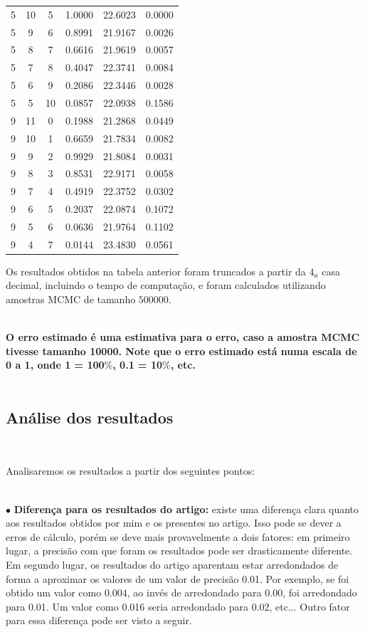 \documentclass[pt12]{article}
\begin{document}
\begin{center}
\begin{tabular}{|ccc|c|c|c|}
 5& 10& 5& 1.0000& 22.6023&0.0000\\
 5& 9& 6& 0.8991& 21.9167&0.0026\\
 5& 8& 7& 0.6616& 21.9619&0.0057\\
 5& 7& 8& 0.4047& 22.3741&0.0084\\
 5& 6& 9& 0.2086& 22.3446&0.0028\\
 5& 5& 10& 0.0857& 22.0938&0.1586\\
 9& 11& 0& 0.1988& 21.2868&0.0449\\
 9& 10& 1& 0.6659& 21.7834&0.0082\\
 9& 9& 2& 0.9929& 21.8084&0.0031\\
 9& 8& 3& 0.8531& 22.9171&0.0058\\
 9& 7& 4& 0.4919& 22.3752&0.0302\\
 9& 6& 5& 0.2037& 22.0874&0.1072\\
 9& 5& 6& 0.0636& 21.9764&0.1102\\
 9& 4& 7& 0.0144& 23.4830&0.0561\\
 \hline
\end{tabular}
\end{center}
\newpage

Os resultados obtidos na tabela anterior foram truncados a partir da $4_a$ casa decimal, incluindo o tempo de computação, e foram calculados utilizando amostras MCMC de tamanho $500000$.\\ 
\ 

\textbf{O erro estimado é uma estimativa para o erro, caso a amostra MCMC tivesse tamanho 10000. Note que o erro estimado  está numa escala de 0 a 1, onde 1 = 100$\%$, 0.1 = 10$\%$, etc.}\\
\ 

\subsection{Análise dos resultados}
\ 

Analisaremos os resultados a partir dos seguintes pontos:\\
\ 

$\bullet$ \textbf{Diferença para os resultados do artigo:} existe uma diferença clara quanto aos resultados obtidos por mim e os presentes no artigo. Isso pode se dever a erros de cálculo, porém se deve mais provavelmente a dois fatores: em primeiro lugar, a precisão com que foram os resultados pode ser drasticamente diferente. Em segundo lugar, os resultados do artigo aparentam estar arredondados de forma a aproximar os valores de um valor de precisão 0.01. Por exemplo, se foi obtido um valor como $0.004$, ao invés de arredondado para 0.00, foi arredondado para 0.01. Um valor como 0.016 seria arredondado para 0.02, etc... Outro fator para essa diferença pode ser visto a seguir.\\
\ 
\end{document}
